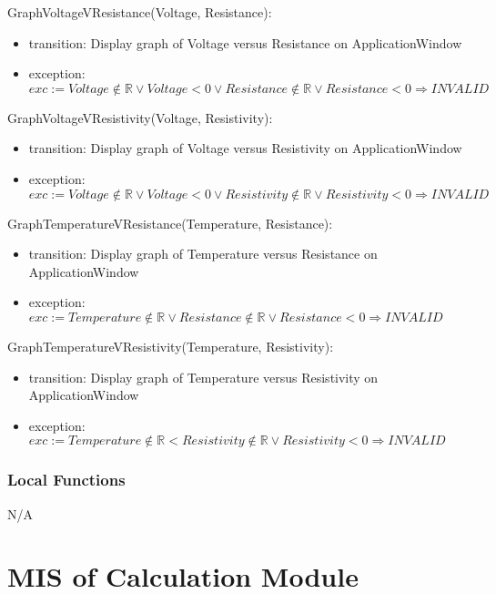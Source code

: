 \documentclass[12pt, titlepage]{article}
\begin{document}
\noindent GraphVoltageVResistance(Voltage, Resistance):
\begin{itemize}
\item transition: Display graph of Voltage versus Resistance on ApplicationWindow
\item exception: $exc:= Voltage\notin  \mathbb{R} \lor Voltage < 0 \lor  Resistance \notin  \mathbb{R} \lor Resistance < 0\Rightarrow INVALID$
\end{itemize}

\noindent GraphVoltageVResistivity(Voltage, Resistivity):
\begin{itemize}
\item transition: Display graph of Voltage versus Resistivity on ApplicationWindow
\item exception: $exc:= Voltage \notin  \mathbb{R} \lor Voltage < 0 \lor  Resistivity \notin  \mathbb{R} \lor Resistivity< 0\Rightarrow INVALID$
\end{itemize}

\noindent GraphTemperatureVResistance(Temperature, Resistance):
\begin{itemize}
\item transition: Display graph of Temperature versus Resistance on ApplicationWindow
\item exception: $exc:= Temperature \notin  \mathbb{R} \lor  Resistance \notin  \mathbb{R} \lor Resistance < 0\Rightarrow INVALID$
\end{itemize}

\noindent GraphTemperatureVResistivity(Temperature, Resistivity):
\begin{itemize}
\item transition: Display graph of Temperature versus Resistivity on ApplicationWindow
\item exception: $exc:= Temperature \notin  \mathbb{R} <  Resistivity \notin  \mathbb{R} \lor Resistivity < 0\Rightarrow INVALID$
\end{itemize}

\subsubsection{Local Functions}

N/A

\newpage


\section{MIS of Calculation Module} \label{Module} 
\end{document}
